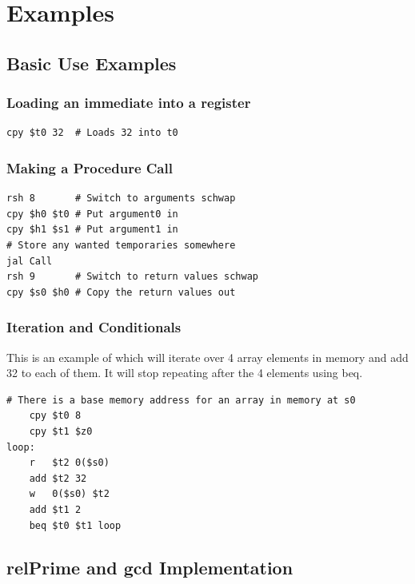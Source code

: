 \documentclass{article}
\begin{document}
\section{Examples}
	\lstset{language=sh}
	\subsection{Basic Use Examples}
		\subsubsection{Loading an immediate into a register}
			\begin{lstlisting}[frame=single]
cpy $t0 32	# Loads 32 into t0
			\end{lstlisting}
		\subsubsection{Making a Procedure Call}
			\begin{lstlisting}[frame=single]
rsh 8		# Switch to arguments schwap
cpy $h0 $t0	# Put argument0 in
cpy $h1 $s1	# Put argument1 in
# Store any wanted temporaries somewhere
jal Call
rsh 9		# Switch to return values schwap
cpy $s0 $h0	# Copy the return values out
			\end{lstlisting}
		\subsubsection{Iteration and Conditionals}
			This is an example of which will iterate over 4 array elements in memory and add 32 to each of them.  It will stop repeating after the 4 elements using beq.
			\begin{lstlisting}[frame=single]
	# There is a base memory address for an array in memory at s0
	cpy $t0 8
	cpy $t1 $z0
loop:
	r   $t2 0($s0)
	add $t2 32
	w   0($s0) $t2
	add $t1 2
	beq $t0 $t1 loop
			\end{lstlisting}
	\subsection{relPrime and gcd Implementation}
\end{document}

